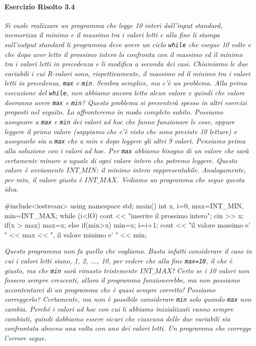 \documentclass[a4paper,12pt]{book}
\begin{document}
\paragraph{Esercizio Risolto 3.4}
\textit{Si vuole realizzare un programma che legge 10 interi dal­l'input standard, memorizza il minimo e il massimo tra i valori letti e alla fine li stampa sull'output standard li programma deve avere un ciclo \texttt{while} che esegue 10 volte e che dopo aver letto il prossimo intero lo confronta con il massimo ed il minimo tra i valori letti in precedenza e li modifica a seconda dei casi.
Chiamiamo le due variabili i cui R-valori sono, rispettivamente, il massimo ed il minimo tra i valori letti in precedenza, \texttt{max} e \texttt{min}.
Sembra semplice, ma c'è un problema.
Alla prima esecuzione del \texttt{while}, non abbiamo ancora letto alcun valore e quindi che valore dovranno avere \texttt{max} e \texttt{min}?
Questo problema si presenterà spesso in altri esercizi proposti nel seguito.
Lo affronteremo in modo completo subito.
Possiamo assegnare a \texttt{max} e \texttt{min} dei valori ad hoc che fanno funzionare le cose, oppure leggere il primo valore (sappiamo che c'è visto che sono previste 10 letture) e assegnarlo sia a \texttt{max} che a min e dopo leggere gli altri 9 valori. Pensiamo prima alla soluzione con i valori ad hoc.
Per \texttt{max} abbiamo bisogno di un valore che sarà certamente minore o uguale di ogni valore intero che potremo leggere.
Questo valore è ovviamente \texttt{$INT\_MIN$}: il minimo intero rappresentabile. Analogamente, per min, il valore giusto è \texttt{$INT\_MAX$}.
Vediamo un programma che segue questa idea.}

\begin{codice}

#include<iostream>
using namespace std;
main() {
  int x, i=0, max=INT_MIN, min=INT_MAX;
  while (i<lO) {
    cout << "inserire il prossimo intero";
    cin >> x;
    if(x > max)
      max=x;
    else
      if(min>x)
        min=x;
    i=i+1;
  }
  cout << "il valore massimo e' " << max << ", il valore minimo e' " << min;
}
\end{codice}

\noindent \textit{Questo programma non fa quello che vogliamo.
Basta infatti considerare il caso in cui i valori letti siano, 1, 2, ..., 10, per vedere che alla fine \texttt{max=10}, il che è giusto, ma che \texttt{min} sarà rimasto tristemente \texttt{$INT\_MAX$}!
Certo se i 10 valori non fossero sempre crescenti, allora il programma funzionerebbe, ma non possiamo accontentarci di un programma che è quasi sempre corretto!
Possiamo correggerlo?
Certamente, ma non è possibile considerare \texttt{min} solo quando \texttt{max} non cambia.
Perché i valori ad hoc con cui li abbiamo inizializzati vanno sempre cambiati, quindi dobbiamo essere sicuri che ciascuna delle due variabili sia confrontata almeno una volta con uno dei valori letti.
Un programma che corregge l'errore segue.}
\end{document}
